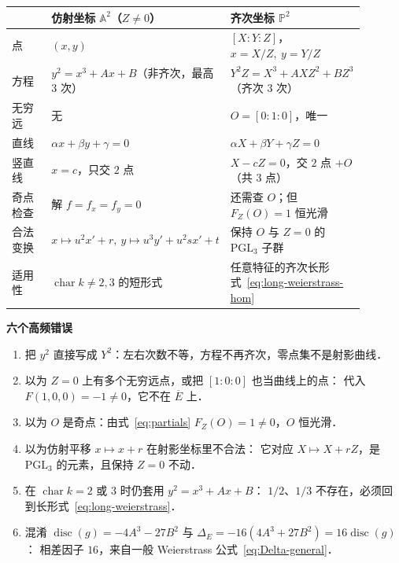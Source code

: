 \documentclass[10pt,a4paper]{article}
\numberwithin{equation}{section}
\begin{document}
\begin{center}
\begin{tabular}{p{0.23\linewidth}|p{0.33\linewidth}|p{0.33\linewidth}}
\hline
 & \textbf{仿射坐标 $\mathbb A^{2}$（$Z\neq0$）} & \textbf{齐次坐标 $\mathbb P^{2}$}\\
\hline
点 & $(x,y)$ & $[X:Y:Z]$，$x=X/Z,\ y=Y/Z$\\
\hline
方程 & $y^{2}=x^{3}+Ax+B$（非齐次，最高 $3$ 次） & $Y^{2}Z=X^{3}+AXZ^{2}+BZ^{3}$（齐次 $3$ 次）\\
\hline
无穷远 & 无 & $O=[0:1:0]$，唯一\\
\hline
直线 & $\alpha x+\beta y+\gamma=0$ & $\alpha X+\beta Y+\gamma Z=0$\\
\hline
竖直线 & $x=c$，只交 $2$ 点 & $X-cZ=0$，交 $2$ 点 $+O$（共 $3$ 点）\\
\hline
奇点检查 & 解 $f=f_{x}=f_{y}=0$ & 还需查 $O$；但 $F_{Z}(O)=1$ 恒光滑\\
\hline
合法变换 & $x\mapsto u^{2}x'+r,\ y\mapsto u^{3}y'+u^{2}sx'+t$ & 保持 $O$ 与 $Z=0$ 的 $\mathrm{PGL}_{3}$ 子群\\
\hline
适用性 & $\operatorname{char}k\neq2,3$ 的短形式 & 任意特征的齐次长形式~\eqref{eq:long-weierstrass-hom}\\
\hline
\end{tabular}
\end{center}

\vspace{1em}
\noindent\textbf{六个高频错误}
\begin{enumerate}
\item 把 $y^{2}$ 直接写成 $Y^{2}$：左右次数不等，方程不再齐次，零点集不是射影曲线．
\item 以为 $Z=0$ 上有多个无穷远点，或把 $[1:0:0]$ 也当曲线上的点：
   代入 $F(1,0,0)=-1\neq0$，它不在 $\overline E$ 上．
\item 以为 $O$ 是奇点：由式~\eqref{eq:partials} $F_{Z}(O)=1\neq0$，$O$ 恒光滑．
\item 以为仿射平移 $x\mapsto x+r$ 在射影坐标里不合法：
   它对应 $X\mapsto X+rZ$，是 $\mathrm{PGL}_{3}$ 的元素，且保持 $Z=0$ 不动．
\item 在 $\operatorname{char}k=2$ 或 $3$ 时仍套用 $y^{2}=x^{3}+Ax+B$：
   $1/2$、$1/3$ 不存在，必须回到长形式~\eqref{eq:long-weierstrass}．
\item 混淆 $\operatorname{disc}(g)=-4A^{3}-27B^{2}$ 与 $\Delta_{E}=-16(4A^{3}+27B^{2})=16\operatorname{disc}(g)$：
   相差因子 $16$，来自一般 Weierstrass 公式~\eqref{eq:Delta-general}．
\end{enumerate}
\end{document}

